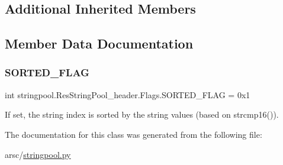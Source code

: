\subsection*{Additional Inherited Members}


\subsection{Member Data Documentation}
\mbox{\label{classstringpool_1_1ResStringPool__header_1_1Flags_a68b1dadda5f1de1ea95e36188bc09416}} 
\subsubsection{\texorpdfstring{S\+O\+R\+T\+E\+D\+\_\+\+F\+L\+AG}{SORTED\_FLAG}}
{\footnotesize\ttfamily int stringpool.\+Res\+String\+Pool\+\_\+header.\+Flags.\+S\+O\+R\+T\+E\+D\+\_\+\+F\+L\+AG = 0x1\hspace{0.3cm}{\ttfamily [static]}}



If set, the string index is sorted by the string values (based on strcmp16()). 



The documentation for this class was generated from the following file\+:\begin{DoxyCompactItemize}
\item 
arsc/\mbox{\hyperlink{stringpool_8py}{stringpool.\+py}}\end{DoxyCompactItemize}
